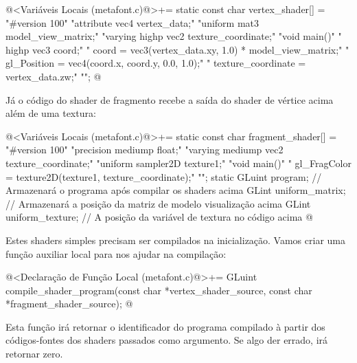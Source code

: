 {{{{{{\iniciocodigo
@<Variáveis Locais (metafont.c)@>+=
static const char vertex_shader[] =
  "#version 100\n"
  "attribute vec4 vertex_data;\n"
  "uniform mat3 model_view_matrix;\n"
  "varying highp vec2 texture_coordinate;\n"
  "void main(){\n"
  "  highp vec3 coord;\n"
  "  coord = vec3(vertex_data.xy, 1.0) * model_view_matrix;\n"
  "  gl_Position = vec4(coord.x, coord.y, 0.0, 1.0);\n"
  "  texture_coordinate = vertex_data.zw;\n"
  "}\n";
@
\fimcodigo

Já o código do shader de fragmento recebe a saída do shader de vértice
acima além de uma textura:

\iniciocodigo
@<Variáveis Locais (metafont.c)@>+=
static const char fragment_shader[] =
  "#version 100\n"
  "precision mediump float;\n"
  "varying mediump vec2 texture_coordinate;\n"
  "uniform sampler2D texture1;\n"
  "void main(){\n"
  "  gl_FragColor = texture2D(texture1, texture_coordinate);"
  "}\n";
static GLuint program; // Armazenará o programa após compilar os shaders acima
GLint uniform_matrix; // Armazenará a posição da matriz de modelo visualização acima
GLint uniform_texture; // A posição da variável de textura no código acima
@
\fimcodigo

Estes shaders simples precisam ser compilados na inicialização. Vamos
criar uma função auxiliar local para nos ajudar na compilação:

\iniciocodigo
@<Declaração de Função Local (metafont.c)@>+=
GLuint compile_shader_program(const char *vertex_shader_source,
                              const char *fragment_shader_source);
@
\fimcodigo

Esta função irá retornar o identificador do programa compilado à
partir dos códigos-fontes dos shaders passados como argumento. Se algo
der errado, irá retornar zero.

}}}}}}
